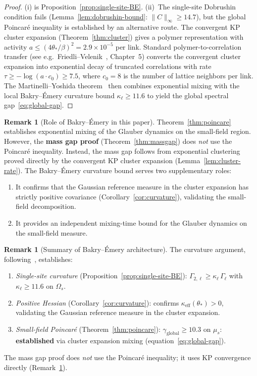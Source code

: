 \documentclass[11pt]{article}
\theoremstyle{definition}
\newtheorem{remark}[theorem]{Remark}
\begin{document}
\begin{proof}
(i) is Proposition~\ref{prop:single-site-BE}.
(ii)~The single-site Dobrushin condition fails
(Lemma~\ref{lem:dobrushin-bound}: $\|C\|_\infty\ge 14.7$),
but the global Poincar\'e inequality is established by an
alternative route.  The convergent KP cluster expansion
(Theorem~\ref{thm:cluster}) gives a polymer representation
with activity $a\le(4\theta_*/\beta)^2=2.9\times 10^{-5}$
per link.  Standard polymer-to-correlation transfer
(see e.g.\ Friedli--Velenik~\cite{FriedliVelenik},
Chapter~5) converts the convergent cluster expansion into
exponential decay of truncated correlations with
rate $\tau\ge-\log(a\cdot c_0)\ge 7.5$, where $c_0=8$
is the number of lattice neighbors per link.
The Martinelli--Yoshida theorem~\cite{Martinelli99,Yoshida99}
then combines exponential mixing with the local
Bakry--\'Emery curvature bound $\kappa_\ell\ge 11.6$
to yield the global spectral gap~\eqref{eq:global-gap}.
\end{proof}

\begin{remark}[Role of Bakry--\'Emery in this paper]%
\label{rem:BE-role}
Theorem~\ref{thm:poincare} establishes exponential mixing
of the Glauber dynamics on the small-field region.  However,
the \textbf{mass gap proof} (Theorem~\ref{thm:massgap}) does
\emph{not} use the Poincar\'e inequality.  Instead, the mass
gap follows from exponential clustering proved directly by the
convergent KP cluster expansion
(Lemma~\ref{lem:cluster-rate}).  The Bakry--\'Emery curvature
bound serves two supplementary roles:
\begin{enumerate}[nosep]
\item It confirms that the Gaussian reference measure in the
  cluster expansion has strictly positive covariance
  (Corollary~\ref{cor:curvature}), validating the small-field
  decomposition.
\item It provides an independent mixing-time bound for the
  Glauber dynamics on the small-field measure.
\end{enumerate}
\end{remark}

\begin{remark}[Summary of Bakry--\'Emery architecture]%
\label{rem:BE-domain}
The curvature argument, following~\cite{BakryEmery},
establishes:
\begin{enumerate}[nosep]
\item \emph{Single-site curvature}
(Proposition~\ref{prop:single-site-BE}):
$\Gamma_{2,\ell}\ge\kappa_\ell\,\Gamma_\ell$ with
$\kappa_\ell\ge 11.6$ on $\Omega_s$.
\item \emph{Positive Hessian}
(Corollary~\ref{cor:curvature}):
confirms $\kappa_{\mathrm{eff}}(\theta_*)>0$, validating
the Gaussian reference measure in the cluster expansion.
\item \emph{Small-field Poincar\'e}
(Theorem~\ref{thm:poincare}):
$\gamma_{\mathrm{global}}\ge 10.3$ on $\mu_s$:
\textbf{established} via cluster expansion mixing
(equation~\eqref{eq:global-gap}).
\end{enumerate}
The mass gap proof does \emph{not} use the Poincar\'e
inequality; it uses KP convergence directly
(Remark~\ref{rem:BE-role}).
\end{remark}
\end{document}
